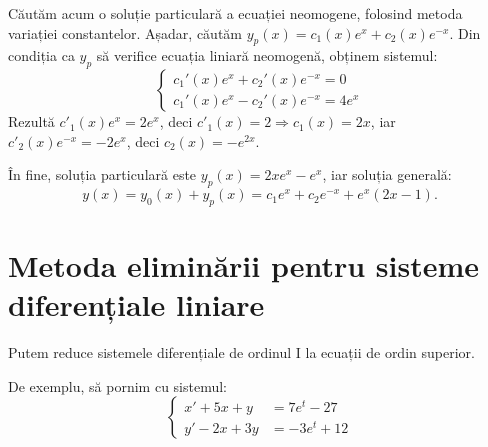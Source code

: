 \documentclass[11pt,a4paper]{article}
\theoremstyle{dotless}
\theoremstyle{dotlessdr}
\begin{document}
Căutăm acum o soluție particulară a ecuației neomogene, folosind metoda variației
constantelor. Așadar, căutăm $y_p(x) = c_1(x) e^x + c_2(x) e^{-x}$. Din condiția
ca $y_p$ să verifice ecuația liniară neomogenă, obținem sistemul:
\[
  \begin{cases}
    c_1'(x) e^x + c_2'(x) e^{-x} = 0 \\
    c_1'(x) e^x - c_2'(x) e^{-x} = 4e^x
  \end{cases}
\]
Rezultă $c'_1(x)e^x = 2e^x$, deci $c'_1(x) = 2 \Rightarrow c_1(x) = 2x$, iar
$c'_2(x) e^{-x} = -2e^x$, deci $c_2(x) = -e^{2x}$.

În fine, soluția particulară este $y_p(x) = 2xe^x - e^x$, iar soluția generală:
\[
  y(x) = y_0(x) + y_p(x) = c_1e^x + c_2 e^{-x} + e^x(2x - 1).
\]



\section{Metoda eliminării pentru sisteme diferențiale liniare}

Putem reduce sistemele diferențiale de ordinul I la ecuații de ordin superior.

De exemplu, să pornim cu sistemul:
\[
  \begin{cases}
    x' + 5x + y &= 7e^t - 27 \\
    y' - 2x + 3y &= -3e^t + 12
  \end{cases}
\]
\end{document}
